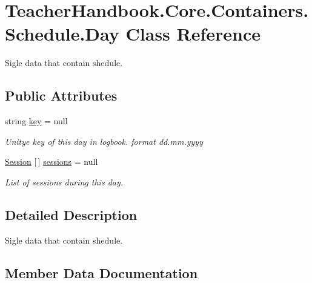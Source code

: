 \hypertarget{class_teacher_handbook_1_1_core_1_1_containers_1_1_schedule_1_1_day}{}\section{Teacher\+Handbook.\+Core.\+Containers.\+Schedule.\+Day Class Reference}
\label{class_teacher_handbook_1_1_core_1_1_containers_1_1_schedule_1_1_day}


Sigle data that contain shedule.  


\subsection*{Public Attributes}
\begin{DoxyCompactItemize}
\item 
string \mbox{\hyperlink{class_teacher_handbook_1_1_core_1_1_containers_1_1_schedule_1_1_day_afd349c077122c7e3193348644bd08828}{key}} = null
\begin{DoxyCompactList}\small\item\em Unitye key of this day in logbook. format dd.\+mm.\+yyyy \end{DoxyCompactList}\item 
\mbox{\hyperlink{class_teacher_handbook_1_1_core_1_1_containers_1_1_schedule_1_1_session}{Session}} \mbox{[}$\,$\mbox{]} \mbox{\hyperlink{class_teacher_handbook_1_1_core_1_1_containers_1_1_schedule_1_1_day_ab7130291674ea826085d0090d6acdddb}{sessions}} = null
\begin{DoxyCompactList}\small\item\em List of sessions during this day. \end{DoxyCompactList}\end{DoxyCompactItemize}


\subsection{Detailed Description}
Sigle data that contain shedule. 



\subsection{Member Data Documentation}
\mbox{\label{class_teacher_handbook_1_1_core_1_1_containers_1_1_schedule_1_1_day_afd349c077122c7e3193348644bd08828}} 
